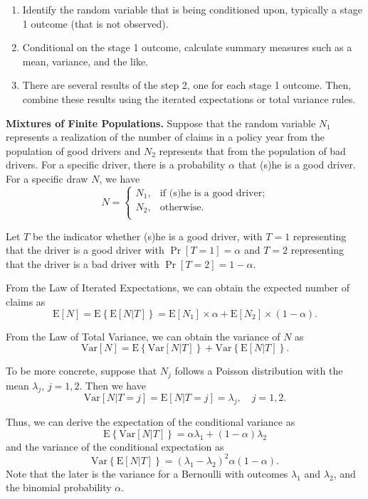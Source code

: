 \documentclass[]{book}
\theoremstyle{definition}
\theoremstyle{definition}
\theoremstyle{definition}
\theoremstyle{remark}
\begin{document}
\begin{enumerate}
\def\labelenumi{\arabic{enumi}.}
\item
  Identify the random variable that is being conditioned upon, typically
  a stage 1 outcome (that is not observed).
\item
  Conditional on the stage 1 outcome, calculate summary measures such as
  a mean, variance, and the like.
\item
  There are several results of the step 2, one for each stage 1 outcome.
  Then, combine these results using the iterated expectations or total
  variance rules.
\end{enumerate}

\textbf{Mixtures of Finite Populations.} Suppose that the random
variable \(N_1\) represents a realization of the number of claims in a
policy year from the population of good drivers and \(N_2\) represents
that from the population of bad drivers. For a specific driver, there is
a probability \(\alpha\) that (s)he is a good driver. For a specific
draw \(N\), we have \[N =
    \begin{cases}
    N_1,  &  \text{if (s)he is a good driver;}\\
    N_2,  &   \text{otherwise}.\\
    \end{cases}\]

Let \(T\) be the indicator whether (s)he is a good driver, with \(T=1\)
representing that the driver is a good driver with \(\Pr[T=1]=\alpha\)
and \(T=2\) representing that the driver is a bad driver with
\(\Pr[T=2]=1-\alpha\).

From the Law of Iterated Expectations, we can obtain the expected number
of claims as \[
    \mathrm{E}[N]= \mathrm{E} \left\{ \mathrm{E} \left[ N | T \right] \right \}= \mathrm{E}[N_1] \times \alpha +  \mathrm{E}[N_2] \times (1-\alpha).\]

From the Law of Total Variance, we can obtain the variance of \(N\) as
\[\mathrm{Var}[N]= \mathrm{E} \left\{ \mathrm{Var} \left[ N | T \right] \right \}
    +\mathrm{Var} \left\{ \mathrm{E} \left[ N | T \right] \right \}.\]

To be more concrete, suppose that \(N_j\) follows a Poisson distribution
with the mean \(\lambda_j\), \(j=1,2\). Then we have
\[\mathrm{Var}[N|T=j]= \mathrm{E}[N|T=j] = \lambda_j, \quad j = 1,2.\]

Thus, we can derive the expectation of the conditional variance as
\[\mathrm{E} \left\{ \mathrm{Var} \left[ N | T \right] \right \} = \alpha \lambda_1+ (1-\alpha) \lambda_2\]
and the variance of the conditional expectation as
\[\mathrm{Var} \left\{ \mathrm{E} \left[ N | T \right] \right \} = (\lambda_1-\lambda_2)^2 \alpha (1-\alpha).\]
Note that the later is the variance for a Bernoulli with outcomes
\(\lambda_1\) and \(\lambda_2\), and the binomial probability
\(\alpha\).
\end{document}
